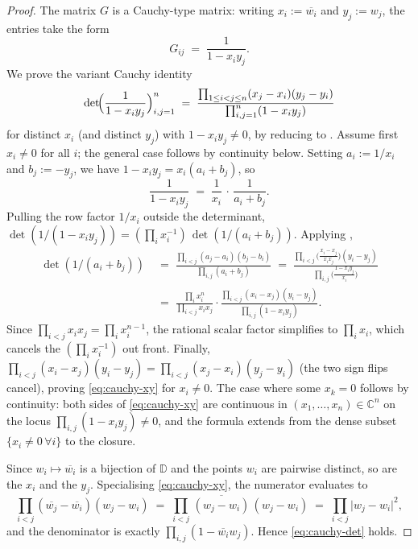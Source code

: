 \documentclass[12pt]{article}
\theoremstyle{definition}
\theoremstyle{remark}
\newcommand{\C}{\mathbb{C}}
\newcommand{\D}{\mathbb{D}}
\newcommand{\abs}[1]{\lvert #1 \rvert}
\newcommand{\conj}[1]{\overline{#1}}
\begin{document}
\begin{proof}
The matrix $G$ is a Cauchy-type matrix: writing
$x_{i}:=\conj{w_{i}}$ and $y_{j}:=w_{j}$, the entries take the form
\[
  G_{ij}\;=\;\frac{1}{1-x_{i}y_{j}}.
\]
We prove the variant Cauchy identity
\begin{equation}\label{eq:cauchy-xy}
  \det\!\Bigl(\frac{1}{1-x_{i}y_{j}}\Bigr)_{i,j=1}^{n}
   \;=\;\frac{\prod_{1\le i<j\le n}(x_{j}-x_{i})(y_{j}-y_{i})}
              {\prod_{i,j=1}^{n}(1-x_{i}y_{j})}
\end{equation}
for distinct $x_{i}$ (and distinct $y_{j}$) with $1-x_{i}y_{j}\neq0$,
by reducing to . Assume first $x_{i}\neq0$ for all
$i$; the general case follows by continuity below. Setting
$a_{i}:=1/x_{i}$ and $b_{j}:=-y_{j}$, we have
$1-x_{i}y_{j}=x_{i}(a_{i}+b_{j})$, so
\[
  \frac{1}{1-x_{i}y_{j}}\;=\;\frac{1}{x_{i}}\,\cdot\,\frac{1}{a_{i}+b_{j}}.
\]
Pulling the row factor $1/x_{i}$ outside the determinant,
$\det(1/(1-x_{i}y_{j}))=(\prod_{i}x_{i}^{-1})\,\det(1/(a_{i}+b_{j}))$.
Applying ,
\begin{align*}
  \det(1/(a_{i}+b_{j}))
   &\;=\;\frac{\prod_{i<j}(a_{j}-a_{i})(b_{j}-b_{i})}{\prod_{i,j}(a_{i}+b_{j})}
   \;=\;\frac{\prod_{i<j}\!\!\bigl(\tfrac{x_{i}-x_{j}}{x_{i}x_{j}}\bigr)(y_{i}-y_{j})}
              {\prod_{i,j}\!\!\bigl(\tfrac{1-x_{i}y_{j}}{x_{i}}\bigr)}\\
   &\;=\;\frac{\prod_{i}x_{i}^{n}}{\prod_{i<j}x_{i}x_{j}}\cdot
       \frac{\prod_{i<j}(x_{i}-x_{j})(y_{i}-y_{j})}{\prod_{i,j}(1-x_{i}y_{j})}.
\end{align*}
Since $\prod_{i<j}x_{i}x_{j}=\prod_{i}x_{i}^{n-1}$, the rational scalar
factor simplifies to $\prod_{i}x_{i}$, which cancels the $(\prod_{i}x_{i}^{-1})$
out front. Finally, $\prod_{i<j}(x_{i}-x_{j})(y_{i}-y_{j})=\prod_{i<j}(x_{j}-x_{i})(y_{j}-y_{i})$
(the two sign flips cancel), proving \eqref{eq:cauchy-xy} for
$x_{i}\neq0$. The case where some $x_{k}=0$ follows by continuity:
both sides of \eqref{eq:cauchy-xy} are continuous in
$(x_{1},\dots,x_{n})\in\C^{n}$ on the locus $\prod_{i,j}(1-x_{i}y_{j})\neq0$,
and the formula extends from the dense subset $\{x_{i}\neq0\,\forall i\}$
to the closure.

Since $w_{i}\mapsto\conj{w_{i}}$ is a bijection of $\D$ and the points
$w_{i}$ are pairwise distinct, so are the $x_{i}$ and the $y_{j}$.
Specialising \eqref{eq:cauchy-xy}, the numerator evaluates to
\[
  \prod_{i<j}(\conj{w_{j}}-\conj{w_{i}})(w_{j}-w_{i})
   \;=\;\prod_{i<j}\,\overline{(w_{j}-w_{i})}\,(w_{j}-w_{i})
   \;=\;\prod_{i<j}\abs{w_{j}-w_{i}}^{2},
\]
and the denominator is exactly $\prod_{i,j}(1-\conj{w_{i}}w_{j})$. Hence
\eqref{eq:cauchy-det} holds.


\end{proof}
\end{document}
